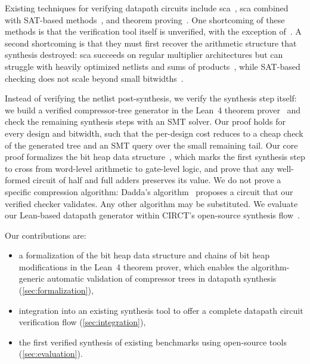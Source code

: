 \documentclass[conference]{IEEEtran}
\theoremstyle{plain}
\theoremstyle{definition}
\begin{document}
Existing techniques for verifying datapath circuits include \ac{sca}~\cite{trace,sca,kleinekathofer2026conflict,mahzoon2021revsca,algebraic_rewriting},
\ac{sca} combined with SAT-based methods~\cite{kaufmann2019verifying}, and theorem proving~\cite{mertcan_acl2multipliers, vescmul_acl2}.
One shortcoming of these methods is that the verification tool itself is unverified, with the exception of~\cite{mertcan_acl2multipliers, vescmul_acl2}.
A second shortcoming is that they must first recover the arithmetic structure that synthesis destroyed: 
\ac{sca} succeeds on regular multiplier architectures but can struggle with heavily optimized netlists 
and sums of products~\cite{mul_verif}, while SAT-based checking
does not scale beyond small bitwidths~\cite{kaufmann2019verifying}.

Instead of verifying the netlist post-synthesis, 
we verify the synthesis step itself: we build a verified compressor-tree generator
in the Lean~4 theorem prover~\cite{moura2021lean} and check the remaining 
synthesis steps with an SMT solver.
Our proof holds for every design and bitwidth, such that the per-design cost reduces 
to a cheap check of the generated tree and an SMT query over the small remaining tail.
Our core proof formalizes the bit heap data structure~\cite{application_specific_arithmetic, arithmetic_core_generation_bitheaps}, 
which marks the first synthesis step to cross from word-level arithmetic to gate-level logic,
and prove that any well-formed circuit of half and full adders preserves its value.
We do not prove a specific compression algorithm: 
Dadda's algorithm~\cite{dadda_tree} proposes a circuit 
that our verified checker validates.
Any other algorithm may be substituted.
We evaluate our Lean-based datapath generator within CIRCT's open-source synthesis flow~\cite{eldridge2021mlir}.


Our contributions are:
\begin{itemize} 
  \item a formalization of the bit heap data structure and 
  chains of bit heap modifications in the Lean~4 theorem prover,
  which enables the algorithm-generic automatic validation of compressor trees in datapath synthesis
  (\autoref{sec:formalization}),
  \item integration into an existing synthesis tool to offer a complete datapath circuit verification flow (\autoref{sec:integration}),
  \item the first verified synthesis of existing benchmarks using open-source tools (\autoref{sec:evaluation}). 
\end{itemize}
\end{document}
